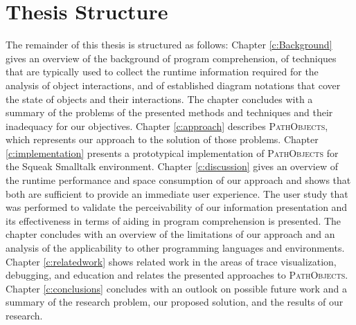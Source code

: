 \section{Thesis Structure}
The remainder of this thesis is structured as follows:
Chapter \ref{c:Background} gives an overview of the background of program comprehension, of techniques that are typically used to collect the runtime information required for the analysis of object interactions, and of established diagram notations that cover the state of objects and their interactions.
The chapter concludes with a summary of the problems of the presented methods and techniques and their inadequacy for our objectives.
Chapter \ref{c:approach} describes \textsc{PathObjects}, which represents our approach to the solution of those problems.
Chapter \ref{c:implementation} presents a prototypical implementation of \textsc{PathObjects} for the Squeak Smalltalk environment.
Chapter \ref{c:discussion} gives an overview of the runtime performance and space consumption of our approach and shows that both are sufficient to provide an immediate user experience.
The user study that was performed to validate the perceivability of our information presentation and its effectiveness in terms of aiding in program comprehension is presented.
The chapter concludes with an overview of the limitations of our approach and an analysis of the applicability to other programming languages and environments.
Chapter \ref{c:relatedwork} shows related work in the areas of trace visualization, debugging, and education and relates the presented approaches to \textsc{PathObjects}.
Chapter \ref{c:conclusions} concludes with an outlook on possible future work and a summary of the research problem, our proposed solution, and the results of our research.
